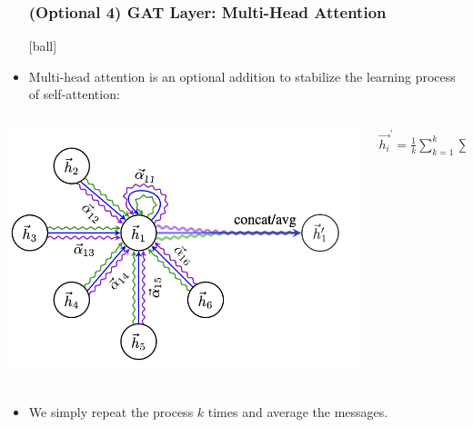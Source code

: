 \documentclass{beamer}
\begin{document}
\begin{frame}[fragile]
\begin{itemize}
\frametitle{(Optional 4) GAT Layer: Multi-Head Attention}
[ball]

\item Multi-head attention is an optional addition to stabilize the learning process of self-attention:

\end{itemize}

\begin{columns}
\begin{column}{0.5\textwidth}
\begin{minipage}[c]{\linewidth}
\vspace{0.5cm}
\hspace{0.5cm}
\includegraphics[width=1\linewidth]{GNN/imgs/multi-head.png}
\end{minipage}
\end{column}
\begin{column}{0.6\textwidth}
\begin{center}
    $\overrightarrow{h_{i}}^{'} = \frac{1}{k} \sum_{k=1}^{k} \sum_{j \in \mathcal{N}_{i}} \alpha_{i,j} \textbf{W}\overrightarrow{h_{j}}$
\end{center}
\end{column}
\end{columns}

\vspace{0.3cm}

\begin{itemize}
    \item We simply repeat the process $k$ times and average the messages.
\end{itemize}

\end{frame}
\end{document}
